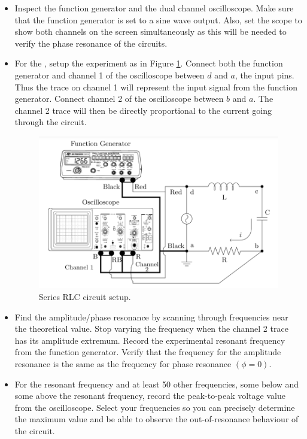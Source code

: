 \documentclass[12pt, a4paper, oneside, openright, titlepage]{book}
\begin{document}
\begin{itemize}[leftmargin = 50pt]
    \item[Step 1:] Inspect the function generator and the dual channel oscilloscope. Make sure that the function generator is set to a sine wave output. Also, set the scope to show both channels on the screen simultaneously as this will be needed to verify the phase resonance of the circuits.
    \item[Step 2:] For the , setup the experiment as in Figure \ref{fig:Res4}. Connect both the function generator and channel 1 of the oscilloscope between $d$ and $a$, the input pins. Thus the trace on channel 1 will represent the input signal from the function generator. Connect channel 2 of the oscilloscope between $b$ and $a$. The channel 2 trace will then be directly proportional to the current going through the circuit.

        \begin{figure}[H]
    \centering
    \includegraphics[scale = 0.8]{Images/Res4.PNG}
    \caption{Series RLC circuit setup.}
    \label{fig:Res4}
\end{figure}
    \item[Step 3:] Find the amplitude/phase resonance by scanning through frequencies near the theoretical value. Stop varying the frequency when the channel 2 trace has its amplitude extremum. Record the experimental resonant frequency from the function generator. Verify that the frequency for the amplitude resonance is the same as the frequency for phase resonance $(\phi = 0)$.
    \item[Step 4:] For the resonant frequency and at least 50 other frequencies, some below and some above the resonant frequency, record the peak-to-peak voltage value from the oscilloscope. Select your frequencies so you can precisely determine the maximum value and be able to observe the out-of-resonance behaviour of the circuit.
\end{itemize}
\end{document}
